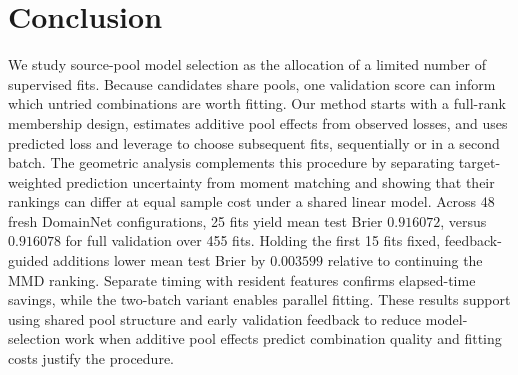 \section{Conclusion}
\label{sec:conclusion}
We study source-pool model selection as the allocation of a limited number of supervised fits. Because candidates share pools, one validation score can inform which untried combinations are worth fitting. Our method starts with a full-rank membership design, estimates additive pool effects from observed losses, and uses predicted loss and leverage to choose subsequent fits, sequentially or in a second batch. The geometric analysis complements this procedure by separating target-weighted prediction uncertainty from moment matching and showing that their rankings can differ at equal sample cost under a shared linear model. Across 48 fresh DomainNet configurations, 25 fits yield mean test Brier $0.916072$, versus $0.916078$ for full validation over 455 fits. Holding the first 15 fits fixed, feedback-guided additions lower mean test Brier by $0.003599$ relative to continuing the MMD ranking. Separate timing with resident features confirms elapsed-time savings, while the two-batch variant enables parallel fitting. These results support using shared pool structure and early validation feedback to reduce model-selection work when additive pool effects predict combination quality and fitting costs justify the procedure.
